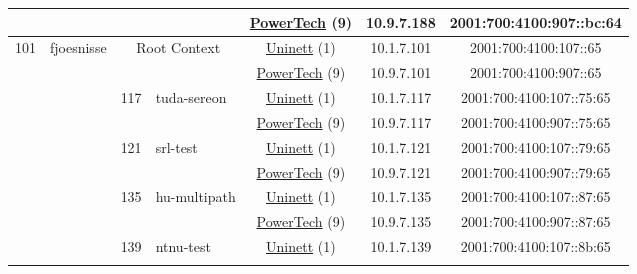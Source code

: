 \begin{small}
\begin{center}
\begin{longtable}{|c|c|c|c|c|c|c|c|}
  &  &  &  & \multicolumn{2}{|c|}{\tiny{\href{http://www.powertech.no}{PowerTech} (9)}} & \tiny{10.9.7.188} & \tiny{2001:700:4100:907::bc:64} \\ \hline
 \multirow{28}{*}{\tiny{101}} & \multicolumn{1}{|l|}{\multirow{28}{*}{\tiny{fjoesnisse}}} & \multicolumn{2}{|c|}{\multirow{2}{*}{\tiny{Root Context}}} & \multicolumn{2}{|c|}{\tiny{\href{https://www.uninett.no}{Uninett} (1)}} & \tiny{10.1.7.101} & \tiny{2001:700:4100:107::65} \\* \cline{5-5}\cline{6-6}\cline{7-7}\cline{8-8}
  &  & \multicolumn{2}{|c|}{} & \multicolumn{2}{|c|}{\tiny{\href{http://www.powertech.no}{PowerTech} (9)}} & \tiny{10.9.7.101} & \tiny{2001:700:4100:907::65} \\* \cline{3-3}\cline{4-4}\cline{5-5}\cline{6-6}\cline{7-7}\cline{8-8}
  &  & \multirow{2}{*}{\tiny{117}} & \multicolumn{1}{|l|}{\multirow{2}{*}{\tiny{tuda-sereon}}} & \multicolumn{2}{|c|}{\tiny{\href{https://www.uninett.no}{Uninett} (1)}} & \tiny{10.1.7.117} & \tiny{2001:700:4100:107::75:65} \\* \cline{5-5}\cline{6-6}\cline{7-7}\cline{8-8}
  &  &  &  & \multicolumn{2}{|c|}{\tiny{\href{http://www.powertech.no}{PowerTech} (9)}} & \tiny{10.9.7.117} & \tiny{2001:700:4100:907::75:65} \\* \cline{3-3}\cline{4-4}\cline{5-5}\cline{6-6}\cline{7-7}\cline{8-8}
  &  & \multirow{2}{*}{\tiny{121}} & \multicolumn{1}{|l|}{\multirow{2}{*}{\tiny{srl-test}}} & \multicolumn{2}{|c|}{\tiny{\href{https://www.uninett.no}{Uninett} (1)}} & \tiny{10.1.7.121} & \tiny{2001:700:4100:107::79:65} \\* \cline{5-5}\cline{6-6}\cline{7-7}\cline{8-8}
  &  &  &  & \multicolumn{2}{|c|}{\tiny{\href{http://www.powertech.no}{PowerTech} (9)}} & \tiny{10.9.7.121} & \tiny{2001:700:4100:907::79:65} \\* \cline{3-3}\cline{4-4}\cline{5-5}\cline{6-6}\cline{7-7}\cline{8-8}
  &  & \multirow{2}{*}{\tiny{135}} & \multicolumn{1}{|l|}{\multirow{2}{*}{\tiny{hu-multipath}}} & \multicolumn{2}{|c|}{\tiny{\href{https://www.uninett.no}{Uninett} (1)}} & \tiny{10.1.7.135} & \tiny{2001:700:4100:107::87:65} \\* \cline{5-5}\cline{6-6}\cline{7-7}\cline{8-8}
  &  &  &  & \multicolumn{2}{|c|}{\tiny{\href{http://www.powertech.no}{PowerTech} (9)}} & \tiny{10.9.7.135} & \tiny{2001:700:4100:907::87:65} \\* \cline{3-3}\cline{4-4}\cline{5-5}\cline{6-6}\cline{7-7}\cline{8-8}
  &  & \multirow{2}{*}{\tiny{139}} & \multicolumn{1}{|l|}{\multirow{2}{*}{\tiny{ntnu-test}}} & \multicolumn{2}{|c|}{\tiny{\href{https://www.uninett.no}{Uninett} (1)}} & \tiny{10.1.7.139} & \tiny{2001:700:4100:107::8b:65} \\* \cline{5-5}\cline{6-6}\cline{7-7}\cline{8-8}

\end{longtable}
\end{center}
\end{small}
